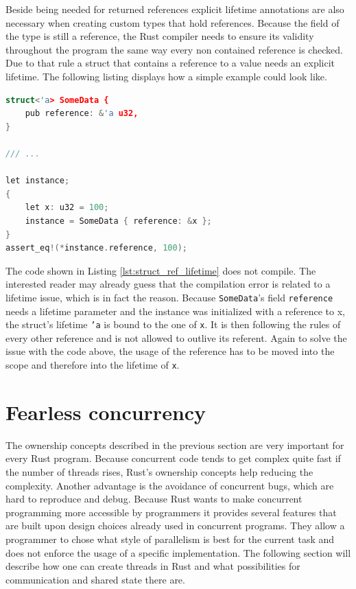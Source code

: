 Beside being needed for returned references explicit lifetime annotations are also necessary when creating custom types that hold references. Because the field of the type is still a reference, the Rust compiler needs to ensure its validity throughout the program the same way every non contained reference is checked. Due to that rule a struct that contains a reference to a value needs an explicit lifetime. The following listing displays how a simple example could look like.\\

\begin{lstlisting}[caption={Struct containing a reference to some value, needing a lifetime annotation to not create a dangling reference.}, label={lst:struct_ref_lifetime}, language=C++]
struct<'a> SomeData {
	pub reference: &'a u32,
}

/// ...

let instance;
{
	let x: u32 = 100;
	instance = SomeData { reference: &x };
}
assert_eq!(*instance.reference, 100);

\end{lstlisting}

\noindent
The code shown in Listing \ref{lst:struct_ref_lifetime} does not compile. The interested reader may already guess that the compilation error is related to a lifetime issue, which is in fact the reason. Because \texttt{SomeData}'s field \texttt{reference} needs a lifetime parameter and the instance was initialized with a reference to x, the struct's lifetime \texttt{'a} is bound to the one of \texttt{x}. It is then following the rules of every other reference and is not allowed to outlive its referent. Again to solve the issue with the code above, the usage of the reference has to be moved into the scope and therefore into the lifetime of \texttt{x}.

\section{Fearless concurrency}

The ownership concepts described in the previous section are very important for every Rust program. Because concurrent code tends to get complex quite fast if the number of threads rises, Rust's ownership concepts help reducing the complexity. Another advantage is the avoidance of concurrent bugs, which are hard to reproduce and debug. Because Rust wants to make concurrent programming more accessible by programmers it provides several features that are built upon design choices already used in concurrent programs. They allow a programmer to chose what style of parallelism is best for the current task and does not enforce the usage of a specific implementation. The following section will describe how one can create threads in Rust and what possibilities for communication and shared state there are.

